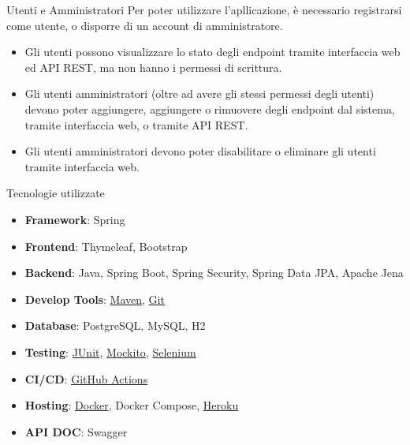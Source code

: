 \documentclass[8pt]{beamer}
\begin{document}
\begin{frame}{Utenti e Amministratori}
    Per poter utilizzare l'apllicazione, è necessario registrarsi come utente, o disporre
    di un account di amministratore.
    \begin{itemize}
        \item Gli utenti possono visualizzare lo stato degli endpoint tramite interfaccia web ed API REST, ma non hanno i permessi di scrittura.
        \item Gli utenti amministratori (oltre ad avere gli stessi permessi degli utenti) devono poter aggiungere, aggiungere o rimuovere degli endpoint dal sistema, tramite interfaccia web, o tramite API REST.
        \item Gli utenti amministratori devono poter disabilitare o eliminare gli utenti tramite interfaccia web.
    \end{itemize}
\end{frame}

\begin{frame}{Tecnologie utilizzate}
    \begin{itemize}
        \item \textbf{Framework}: Spring
        \item \textbf{Frontend}: Thymeleaf, Bootstrap
        \item \textbf{Backend}: Java, Spring Boot, Spring Security, Spring Data JPA, Apache Jena
        \item \textbf{Develop Tools}: \underline{Maven}, \underline{Git}
        \item \textbf{Database}: PostgreSQL, MySQL, H2
        \item \textbf{Testing}: \underline{JUnit}, \underline{Mockito}, \underline{Selenium}
        \item \textbf{CI/CD}: \underline{GitHub Actions}
        \item \textbf{Hosting}: \underline{Docker}, Docker Compose, \underline{Heroku}
        \item \textbf{API DOC}: Swagger
    \end{itemize}
\end{frame}
\end{document}
